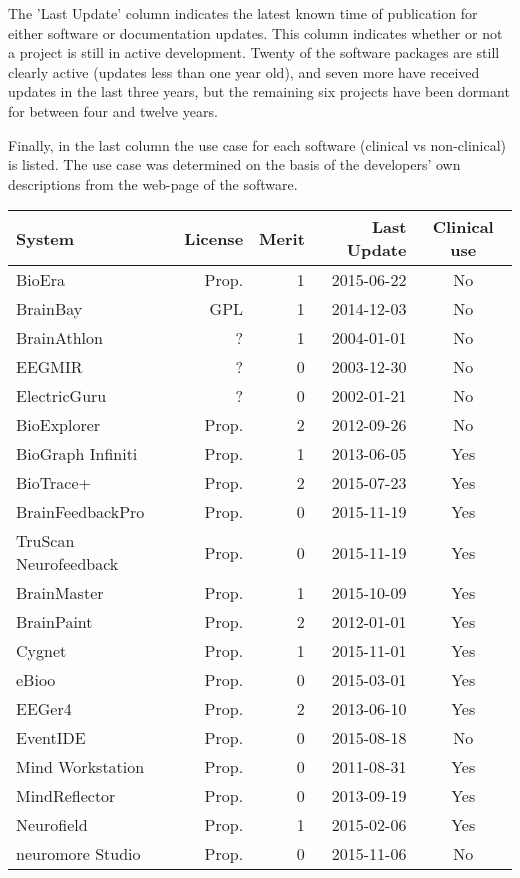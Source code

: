 The 'Last Update' column indicates the latest known time of publication for either software or documentation updates. This column indicates whether or not a project is still in active development. Twenty of the software packages are still clearly active (updates less than one year old), and seven more have received updates in the last three years, but the remaining six projects have been dormant for between four and twelve years.

Finally, in the last column the use case for each software (clinical vs non-clinical) is listed. The use case was determined on the basis of the developers' own descriptions from the web-page of the software.

\begin{table}[ht]
\centering
\begin{tabular}{lrrrc}
System & License & Merit & Last Update & Clinical use \\       
\hline
BioEra & Prop. & 1 & 2015-06-22 & No \\   
BrainBay & GPL & 1 & 2014-12-03 & No \\   
BrainAthlon & ? & 1 & 2004-01-01 & No \\   
EEGMIR & ? & 0 & 2003-12-30 & No \\   
ElectricGuru & ? & 0 & 2002-01-21 & No \\   
BioExplorer & Prop. & 2 & 2012-09-26 & No \\  
BioGraph Infiniti & Prop. & 1 & 2013-06-05 & Yes \\
BioTrace+ & Prop. & 2 & 2015-07-23 & Yes \\
BrainFeedbackPro & Prop. & 0 & 2015-11-19 & Yes \\
TruScan Neurofeedback & Prop. & 0 & 2015-11-19 & Yes \\
BrainMaster & Prop. & 1 & 2015-10-09 & Yes \\
BrainPaint & Prop. & 2 & 2012-01-01 & Yes \\
Cygnet & Prop. & 1 & 2015-11-01 & Yes \\
eBioo & Prop. & 0 & 2015-03-01 & Yes \\
EEGer4 & Prop. & 2 & 2013-06-10 & Yes \\
EventIDE & Prop. & 0 & 2015-08-18 & No \\
Mind Workstation & Prop. & 0 & 2011-08-31 & Yes \\
MindReflector & Prop. & 0 & 2013-09-19 & Yes \\
Neurofield & Prop. & 1 & 2015-02-06 & Yes \\
neuromore Studio & Prop. & 0 & 2015-11-06 & No \\

\end{tabular}
\end{table}
